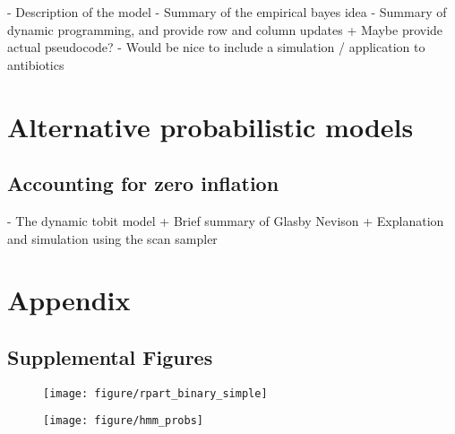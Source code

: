 \documentclass{article}
\begin{document}
- Description of the model
- Summary of the empirical bayes idea
- Summary of dynamic programming, and provide row and column updates
  + Maybe provide actual pseudocode?
- Would be nice to include a simulation / application to antibiotics


\section{Alternative probabilistic models}
\label{sec:alternative_probabilistic_models}
\subsection{Accounting for zero inflation}

- The dynamic tobit model
  + Brief summary of Glasby Nevison
  + Explanation and simulation using the scan sampler




\section{Appendix}
\label{sec:appendix}

\subsection{Supplemental Figures}
\label{subsec:supplemental_figures}

\begin{figure}[ht]
  \centering
  \caption{\label{fig:rpart_simple} }
\end{figure}

\begin{figure}[ht]
  \centering
  \caption{\label{fig:label} }
\end{figure}

\begin{figure}[ht]
  \centering
  \caption{\label{fig:rpart_complex_3} }
\end{figure}

\begin{figure}[ht]
  \centering
  \texttt{[image: figure/rpart\_binary\_simple]}
  \caption{\label{fig:rpart_binary_simple} }
\end{figure}

\begin{figure}[ht]
  \centering
  \caption{\label{fig:rpart_conditional} }
\end{figure}

\begin{figure}[ht]
  \centering
  \texttt{[image: figure/hmm\_probs]}
  \caption{\label{fig:hmm_probs} }
\end{figure}
\end{document}
